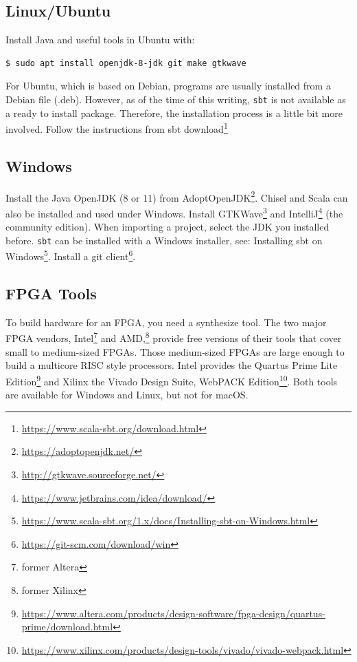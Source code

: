 \documentclass[%
    10pt,
    headinclude, footexclude,
    openright, %
    notitlepage,
    cleardoubleempty,
    headsepline,
    pointlessnumbers,
    bibtotoc, idxtotoc,
    ]{scrbook}
\newcommand{\code}[1]{{\small{\texttt{#1}}}}
\newcommand{\myref}[2]{\href{#1}{#2}}
\renewcommand{\myref}[2]{{#2}{\footnote{\url{#1}}}}
\begin{document}
\subsection{Linux/Ubuntu}

Install Java and useful tools in Ubuntu with:
\begin{verbatim}
$ sudo apt install openjdk-8-jdk git make gtkwave
\end{verbatim}

For Ubuntu, which is based on Debian, programs are usually installed from a
Debian file (.deb). However, as of the time of this writing, \code{sbt} is not
available as a ready to install package. Therefore, the installation process
is a little bit more involved.
Follow the instructions from \myref{https://www.scala-sbt.org/download.html}{sbt download}

\subsection{Windows}

Install the Java OpenJDK (8 or 11) from \myref{https://adoptopenjdk.net/}{AdoptOpenJDK}.
Chisel and Scala can also be installed and used under Windows.
Install \myref{http://gtkwave.sourceforge.net/}{GTKWave} and
\myref{https://www.jetbrains.com/idea/download/}{IntelliJ} (the community edition).
When importing a project, select the JDK you installed before.
\code{sbt} can be installed with a Windows installer, see:
\myref{https://www.scala-sbt.org/1.x/docs/Installing-sbt-on-Windows.html}{Installing sbt on Windows}.
Install a \myref{https://git-scm.com/download/win}{git client}.

\subsection{FPGA Tools}

To build hardware for an FPGA, you need a synthesize tool. The two major
FPGA vendors, Intel\footnote{former Altera} and AMD,\footnote{former Xilinx} provide free versions of
their tools that cover small to medium-sized FPGAs. Those medium-sized
FPGAs are large enough to build a multicore RISC style processors.
Intel provides the \myref{https://www.altera.com/products/design-software/fpga-design/quartus-prime/download.html}{Quartus Prime Lite Edition} and Xilinx the
\myref{https://www.xilinx.com/products/design-tools/vivado/vivado-webpack.html}{Vivado Design Suite, WebPACK Edition}.
Both tools are available for Windows and Linux, but not for macOS.
\end{document}
